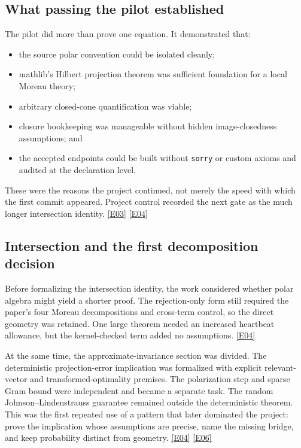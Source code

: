 \documentclass[11pt,a4paper]{article}
\newcommand{\ev}[1]{%
  \hyperref[ev:#1]{\textcolor{ReportBlue}{\textsf{\scriptsize[#1]}}}}
\begin{document}
\subsection{What passing the pilot established}

The pilot did more than prove one equation. It demonstrated that:

\begin{itemize}
  \item the source polar convention could be isolated cleanly;
  \item mathlib's Hilbert projection theorem was sufficient foundation for a local
    Moreau theory;
  \item arbitrary closed-cone quantification was viable;
  \item closure bookkeeping was manageable without hidden image-closedness
    assumptions; and
  \item the accepted endpoints could be built without \texttt{sorry} or custom
    axioms and audited at the declaration level.
\end{itemize}

These were the reasons the project continued, not merely the speed with which the
first commit appeared. Project control recorded the next gate as the much longer
intersection identity. \ev{E03}\ev{E04}

\subsection{Intersection and the first decomposition decision}

Before formalizing the intersection identity, the work considered whether polar
algebra might yield a shorter proof. The rejection-only form still required the
paper's four Moreau decompositions and cross-term control, so the direct geometry was
retained. One large theorem needed an increased heartbeat allowance, but the
kernel-checked term added no assumptions. \ev{E04}

At the same time, the approximate-invariance section was divided. The deterministic
projection-error implication was formalized with explicit relevant-vector and
transformed-optimality premises. The polarization step and sparse Gram bound were
independent and became a separate task. The random Johnson--Lindenstrauss guarantee
remained outside the deterministic theorem. This was the first repeated use of a
pattern that later dominated the project: prove the implication whose assumptions
are precise, name the missing bridge, and keep probability distinct from geometry.
\ev{E04}\ev{E06}
\end{document}

